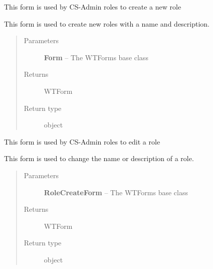 \documentclass[letterpaper,10pt,english]{sphinxmanual}
\begin{document}
\begin{fulllineitems}
\label{dev-users:cagenix.users.forms.RoleCreateForm}
This form is used by CS-Admin roles to create a new role

This form is used to create new roles with a name and description.
\begin{quote}\begin{description}
\item[{Parameters}] \leavevmode
\textbf{Form} -- The WTForms base class

\item[{Returns}] \leavevmode
WTForm

\item[{Return type}] \leavevmode
object

\end{description}\end{quote}

\end{fulllineitems}


\begin{fulllineitems}
\label{dev-users:cagenix.users.forms.RoleEditForm}
This form is used by CS-Admin roles to edit a role

This form is used to change the name or description of a role.
\begin{quote}\begin{description}
\item[{Parameters}] \leavevmode
\textbf{RoleCreateForm} -- The WTForms base class

\item[{Returns}] \leavevmode
WTForm

\item[{Return type}] \leavevmode
object

\end{description}\end{quote}

\end{fulllineitems}
\end{document}
